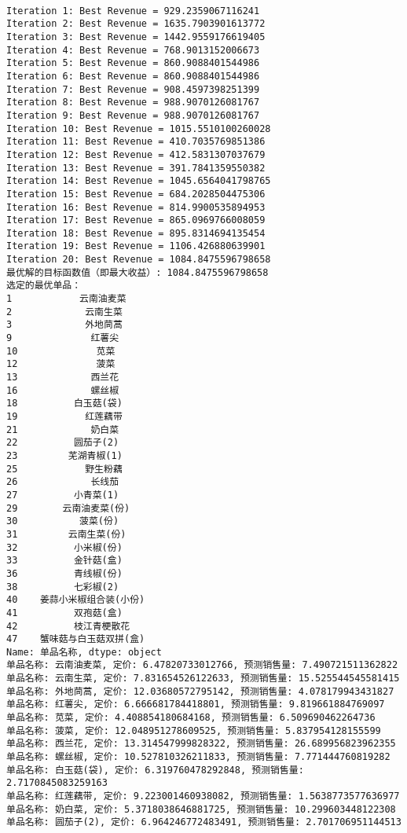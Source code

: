 \documentclass[withoutpreface,bwprint]{cumcmthesis} %
\begin{document}
\begin{lstlisting}[language=text]

Iteration 1: Best Revenue = 929.2359067116241
Iteration 2: Best Revenue = 1635.7903901613772
Iteration 3: Best Revenue = 1442.9559176619405
Iteration 4: Best Revenue = 768.9013152006673
Iteration 5: Best Revenue = 860.9088401544986
Iteration 6: Best Revenue = 860.9088401544986
Iteration 7: Best Revenue = 908.4597398251399
Iteration 8: Best Revenue = 988.9070126081767
Iteration 9: Best Revenue = 988.9070126081767
Iteration 10: Best Revenue = 1015.5510100260028
Iteration 11: Best Revenue = 410.7035769851386
Iteration 12: Best Revenue = 412.5831307037679
Iteration 13: Best Revenue = 391.7841359550382
Iteration 14: Best Revenue = 1045.6564041798765
Iteration 15: Best Revenue = 684.2028504475306
Iteration 16: Best Revenue = 814.9900535894953
Iteration 17: Best Revenue = 865.0969766008059
Iteration 18: Best Revenue = 895.8314694135454
Iteration 19: Best Revenue = 1106.426880639901
Iteration 20: Best Revenue = 1084.8475596798658
最优解的目标函数值（即最大收益）: 1084.8475596798658
选定的最优单品：
1            云南油麦菜
2             云南生菜
3             外地茼蒿
9              红薯尖
10              苋菜
12              菠菜
13             西兰花
16             螺丝椒
18          白玉菇(袋)
19            红莲藕带
21             奶白菜
22          圆茄子(2)
23         芜湖青椒(1)
25            野生粉藕
26             长线茄
27          小青菜(1)
29        云南油麦菜(份)
30           菠菜(份)
31         云南生菜(份)
32          小米椒(份)
33          金针菇(盒)
36          青线椒(份)
38          七彩椒(2)
40    姜蒜小米椒组合装(小份)
41          双孢菇(盒)
42          枝江青梗散花
47    蟹味菇与白玉菇双拼(盒)
Name: 单品名称, dtype: object
单品名称: 云南油麦菜, 定价: 6.47820733012766, 预测销售量: 7.490721511362822
单品名称: 云南生菜, 定价: 7.831654526122633, 预测销售量: 15.525544545581415
单品名称: 外地茼蒿, 定价: 12.03680572795142, 预测销售量: 4.078179943431827
单品名称: 红薯尖, 定价: 6.666681784418801, 预测销售量: 9.819661884769097
单品名称: 苋菜, 定价: 4.408854180684168, 预测销售量: 6.509690462264736
单品名称: 菠菜, 定价: 12.048951278609525, 预测销售量: 5.837954128155599
单品名称: 西兰花, 定价: 13.314547999828322, 预测销售量: 26.689956823962355
单品名称: 螺丝椒, 定价: 10.527810326211833, 预测销售量: 7.771444760819282
单品名称: 白玉菇(袋), 定价: 6.319760478292848, 预测销售量: 2.7170845083259163
单品名称: 红莲藕带, 定价: 9.223001460938082, 预测销售量: 1.5638773577636977
单品名称: 奶白菜, 定价: 5.3718038646881725, 预测销售量: 10.299603448122308
单品名称: 圆茄子(2), 定价: 6.964246772483491, 预测销售量: 2.701706951144513

\end{lstlisting}
\end{document}
